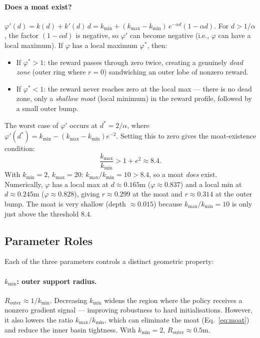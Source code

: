 \documentclass{article}
\begin{document}
\paragraph{Does a moat exist?}
$\varphi'(d) = k(d) + k'(d)\,d = k_{\min} + (k_{\max}-k_{\min})\,e^{-\alpha d}(1 - \alpha d)$.
For $d > 1/\alpha$, the factor $(1-\alpha d)$ is negative, so $\varphi'$ can become
negative (i.e., $\varphi$ can have a local maximum). If $\varphi$ has a local maximum
$\varphi^*$, then:
\begin{itemize}
    \item If $\varphi^* > 1$: the reward passes through zero twice, creating a
    genuinely \emph{dead zone} (outer ring where $r=0$) sandwiching an outer lobe
    of nonzero reward.
    \item If $\varphi^* < 1$: the reward never reaches zero at the local max ---
    there is no dead zone, only a \emph{shallow moat} (local minimum) in the
    reward profile, followed by a small outer bump.
\end{itemize}
The worst case of $\varphi'$ occurs at $d^* = 2/\alpha$, where
$\varphi'(d^*) = k_{\min} - (k_{\max}-k_{\min})e^{-2}$.
Setting this to zero gives the moat-existence condition:
\begin{equation}
    \frac{k_{\max}}{k_{\min}} > 1 + e^{2} \approx 8.4.
    \label{eq:moat}
\end{equation}
With $k_{\min}=2$, $k_{\max}=20$: $k_{\max}/k_{\min} = 10 > 8.4$, so a moat
\emph{does} exist. Numerically, $\varphi$ has a local max at $d\approx 0.165$m
($\varphi \approx 0.837$) and a local min at $d\approx 0.245$m ($\varphi \approx 0.828$),
giving $r \approx 0.299$ at the moat and $r \approx 0.314$ at the outer bump. The moat
is very shallow (depth $\approx 0.015$) because $k_{\max}/k_{\min} = 10$ is only just above
the threshold $8.4$.

\subsection{Parameter Roles}

Each of the three parameters controls a distinct geometric property:

\paragraph{$k_{\min}$: outer support radius.}
$R_{\mathrm{outer}} \approx 1/k_{\min}$. Decreasing $k_{\min}$ widens the region where
the policy receives a nonzero gradient signal --- improving robustness to hard
initialisations. However, it also lowers the ratio $k_{\max}/k_{\min}$, which can
eliminate the moat (Eq.~\eqref{eq:moat}) and reduce the inner basin tightness.
With $k_{\min}=2$, $R_{\mathrm{outer}} \approx 0.5$m.
\end{document}
